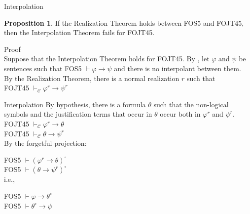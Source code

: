 \documentclass{beamer}
\theoremstyle{definition}
\newtheorem{pro}{Proposition}
\newcommand{\C}{\mathcal{C}}
\newcommand{\impli}{\rightarrow}
\newcommand{\teo}{\vdash}
\begin{document}
\begin{frame}{Interpolation}

\begin{pro}
If the Realization Theorem holds between FOS5 and FOJT45, then the Interpolation Theorem fails for FOJT45. 
\end{pro}

{\color{blue} Proof}\\ 
\qquad Suppose that the Interpolation Theorem holds for FOJT45. By \cite{Fine79}, let $\varphi$ and $\psi$ be sentences such that FOS5 $\teo \varphi \impli \psi$ and there is no interpolant between them.\\
\vspace{5mm}
\qquad By the Realization Theorem, there is a normal realization $r$ such that\\
\vspace{5mm}
FOJT45 $\teo_{\C} \varphi^{r} \impli \psi^{r}$\\
\end{frame}



\begin{frame}{Interpolation}
\qquad By hypothesis, there is a formula $\theta$ such that the non-logical symbols and the justification terms that occur in $\theta$ occur both in $\varphi^{r}$ and $\psi^{r}$. \\
\vspace{5mm}
FOJT45 $\teo_{\C} \varphi^{r} \impli \theta$\\
FOJT45 $\teo_{\C} \theta \impli \psi^{r}$\\	
\vspace{5mm}
\qquad By the forgetful projection: 



\vspace{5mm}
FOS5 $\teo (\varphi^{r} \impli \theta)^{\circ}$\\
FOS5 $\teo (\theta \impli \psi^{r})^{\circ}$\\	
\vspace{5mm}
i.e.,

\vspace{5mm}
FOS5 $\teo \varphi \impli \theta^{\circ}$\\
FOS5 $\teo \theta^{\circ} \impli \psi$\\	

\end{frame}
\end{document}
